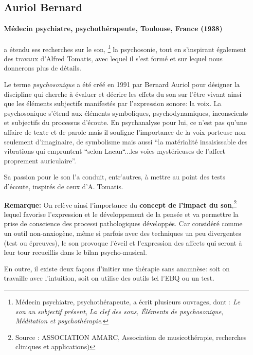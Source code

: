       \subsection{Auriol Bernard}
 
\paragraph{Médecin psychiatre,
   psychothérapeute, Toulouse, France (1938)}
a étendu ses recherches sur le son, \footnote{Médecin psychiatre, psychothérapeute,  a écrit plusieurs ouvrages, dont : \textsl{Le son au subjectif présent}, \textsl{La clef des sons, Éléments de psychosonique}, \textsl{Méditation et
  psychothérapie}.} la psychosonie, 
tout en s'inspirant également des
travaux d'Alfred Tomatis, avec lequel il s'est formé et sur lequel
nous donnerons plus de détails.

Le terme \emph{psychosonique} a été créé en 1991 par Bernard Auriol pour
désigner la discipline qui cherche à évaluer et décrire les effets du
son sur l'être vivant ainsi que les éléments
subjectifs manifestés par l'expression sonore:  la
voix. La psychosonique s'étend aux éléments
symboliques, psychodynamiques, inconscients et subjectifs du processus
d'écoute. En psychanalyse pour lui, ce n'est pas qu'une affaire de
texte et de parole mais il souligne l'importance de la voix porteuse non seulement
d'imaginaire, de symbolisme mais aussi ``la matérialité insaisissable
des vibrations qui empruntent ``selon Lacan``...les voies mystérieuses de
l'affect proprement auriculaire''. 
\autocite[ch. 13]{auriol:cle}

Sa passion pour le son l'a conduit, entr'autres, à mettre au point des tests
d'écoute, inspirés de ceux d'A. Tomatis.




\textbf{Remarque: } 
On relève ainsi l'importance du \textbf{concept de l'impact du son},\footnote{Source : ASSOCIATION AMARC,
  Association de musicothérapie, recherches cliniques et
  applications) } 
lequel favorise l'expression et le développement de la pensée et va
permettre la prise de conscience des processi pathologiques
développés. Car considéré comme un outil non-anxiogène, même si parfois avec des
techniques un peu divergentes (test ou épreuves), le son provoque l'éveil et l'expression
des affects qui seront à leur tour recueillis dans le bilan psycho-musical.

En outre, il existe deux façons d'initier une thérapie sans anamnèse: soit on
travaille avec l'intuition, soit on utilise des outils tel l'EBQ ou un test.

